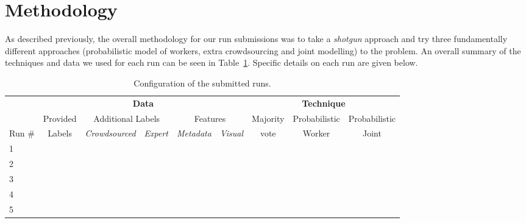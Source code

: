 \documentclass{../acm_proc_article-me11_tweaked}
\begin{document}
\section{Methodology}
As described previously, the overall methodology for our run submissions was to take a \emph{shotgun} approach and try three fundamentally different approaches (probabilistic model of workers, extra crowdsourcing and joint modelling) to the problem. An overall summary of the techniques and data we used for each run can be seen in Table~\ref{tab:config}. Specific details on each run are given below.

\begin{table}[t]
	\centering
	\caption{\label{tab:config}Configuration of the submitted runs.}
	\begin{tabular}{|l||c|c|c|c|c||c|c|c|}
		\hline	
		& \multicolumn{5}{c||}{\textbf{Data}} & \multicolumn{3}{c|}{\textbf{Technique}}\\
		\cline{2-9}
	& Provided & \multicolumn{2}{c|}{Additional Labels} & \multicolumn{2}{c||}{Features} & Majority & Probabilistic & Probabilistic\\
	\cline{3-6}
	Run \# & Labels & \emph{Crowdsourced} & \emph{Expert} & \emph{Metadata} & \emph{Visual} & vote & Worker & Joint\\
	
	\hline\hline
	1 & \checkmark & & & & & & \checkmark & \\ \hline
	2 & \checkmark & \checkmark & \checkmark & & & \checkmark & & \\ \hline
	3 & \checkmark & \checkmark & \checkmark & & & & \checkmark & \\ \hline
	4 & \checkmark & \checkmark & \checkmark & \checkmark & & & & \checkmark \\ \hline
	5 & \checkmark & \checkmark & \checkmark & \checkmark & \checkmark & & &\checkmark \\ \hline
	\end{tabular}
\end{table}
\end{document}

